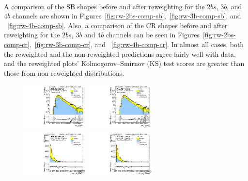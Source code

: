 \paragraph{}
A comparison of the SB shapes before and after reweighting for the $2bs$, $3b$, and $4b$ channels are shown in Figures~\ref{fig:rw-2bs-comp-sb},~\ref{fig:rw-3b-comp-sb}, and ~\ref{fig:rw-4b-comp-sb}. 
Also, a comparison of the CR shapes before and after reweighting for the $2bs$, $3b$ and $4b$ channels can be seen in Figures~\ref{fig:rw-2bs-comp-cr},~\ref{fig:rw-3b-comp-cr}, and ~\ref{fig:rw-4b-comp-cr}. 
In almost all cases, both the reweighted and the non-reweighted predictions agree fairly well with  data, and the reweighted plots' Kolmogorov–Smirnov (KS) test scores are greater than those from non-reweighted distributions. 
\begin{figure}[htbp!]
\begin{center}
\includegraphics[width=0.31\textwidth,angle=-90]{figures/boosted/Prereweight/Moriond_TwoTag_split_Sideband_mHH_l_1.pdf}
\includegraphics[width=0.31\textwidth,angle=-90]{figures/boosted/Sideband/b77_TwoTag_split_Sideband_mHH_l_1.pdf}\\
\includegraphics[width=0.31\textwidth,angle=-90]{figures/boosted/Prereweight/Moriond_TwoTag_split_Sideband_leadHCand_Pt_m.pdf}
\includegraphics[width=0.31\textwidth,angle=-90]{figures/boosted/Sideband/b77_TwoTag_split_Sideband_leadHCand_Pt_m.pdf}\\

\end{center}
\end{figure}
